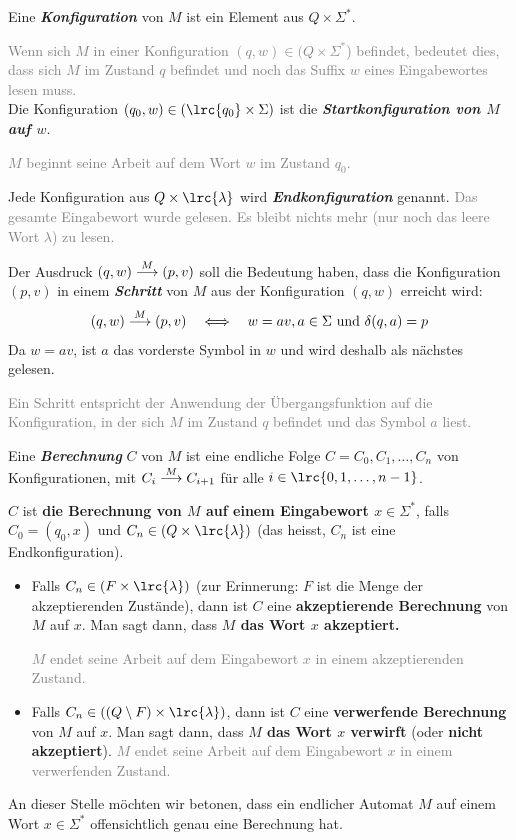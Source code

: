 Eine \textit{\textbf{Konfiguration}} von $M$ ist ein Element aus $Q\times \Sigma^*$.

\textcolor{Gray}{Wenn sich $M$ in einer Konfiguration $(q,w)\in (Q\times \Sigma^*$) befindet, bedeutet dies, dass sich $M$ im Zustand $q$ befindet und noch das Suffix $w$ eines Eingabewortes lesen muss.}\\

Die Konfiguration $(q_0,w)\in (\lrc{q_0}\times \Sigma)$ ist die \textit{\textbf{Startkonfiguration von $M$ auf $w$}}.

\textcolor{Gray}{$M$ beginnt seine Arbeit auf dem Wort $w$ im Zustand $q_0$.}

Jede Konfiguration aus $Q\times\lrc{\lambda}$ wird \textit{\textbf{Endkonfiguration}} genannt.
\textcolor{Gray}{Das gesamte Eingabewort wurde gelesen. Es bleibt nichts mehr (nur noch das leere Wort $\lambda$) zu lesen.}

Der Ausdruck $(q,w)\overset{M}{\longrightarrow} (p,v)$ soll die Bedeutung haben, dass die Konfiguration $(p,v)$ in einem \textit{\textbf{Schritt}} von $M$ aus der Konfiguration $(q,w)$ erreicht wird:
\begin{align*}
	(q,w)\overset{M}{\longrightarrow} (p,v) \quad \Longleftrightarrow \quad w = av, a\in\Sigma\text{ und } \delta(q,a) = p
\end{align*}
Da $w = av$, ist $a$ das vorderste Symbol in $w$ und wird deshalb als nächstes gelesen.

\textcolor{Gray}{Ein Schritt entspricht der Anwendung der Übergangsfunktion auf die Konfiguration, in der sich $M$ im Zustand $q$ befindet und das Symbol $a$ liest.}

Eine \textit{\textbf{Berechnung}} $C$ von $M$ ist eine endliche Folge $C = C_0, C_1, \ldots , C_n$ von Konfigurationen, mit $C_i\overset{M}{\longrightarrow} C_{i+1}$ für alle $i\in\lrc{0,1,\ldots , n-1}$.

$C$ ist \textbf{die Berechnung von $M$ auf einem Eingabewort $x\in\Sigma^*$}, falls $C_0 = (q_0,x)$ und $C_n\in (Q\times \lrc{\lambda})$ (das heisst, $C_n$ ist eine Endkonfiguration).

\begin{itemize}
	\item Falls $C_n\in (F\times \lrc{\lambda})$ (zur Erinnerung: $F$ ist die Menge der akzeptierenden Zustände), dann ist $C$ eine \textbf{akzeptierende Berechnung} von $M$ auf $x$. Man sagt dann, dass \textbf{$M$ das Wort $x$ akzeptiert.}

	      \textcolor{Gray}{$M$ endet seine Arbeit auf dem Eingabewort $x$ in einem akzeptierenden Zustand.}
	\item Falls $C_n\in ((Q\setminus F)\times \lrc{\lambda})$, dann ist $C$ eine \textbf{verwerfende Berechnung} von $M$ auf $x$. Man sagt dann, dass \textbf{$M$ das Wort $x$ verwirft} (oder \textbf{nicht akzeptiert}).
	      \textcolor{Gray}{$M$ endet seine Arbeit auf dem Eingabewort $x$ in einem verwerfenden Zustand.}
\end{itemize}
An dieser Stelle möchten wir betonen, dass ein endlicher Automat $M$ auf einem Wort $x\in\Sigma^*$ offensichtlich genau eine Berechnung hat.

